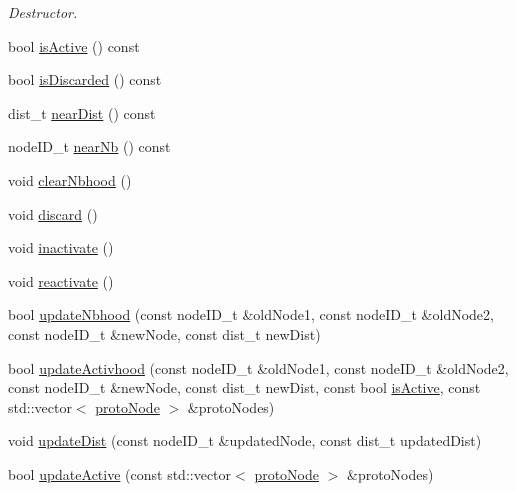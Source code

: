 \begin{DoxyCompactItemize}
\begin{DoxyCompactList}\small\item\em \-Destructor. \end{DoxyCompactList}\item 
bool \hyperlink{classprotoNode_aa1845f5c6b3dccbdbf34d5dc4a473908}{is\-Active} () const 
\item 
bool \hyperlink{classprotoNode_ab2d1c59170381bf98489530091fcaabe}{is\-Discarded} () const 
\item 
dist\-\_\-t \hyperlink{classprotoNode_affed3066e510c22006a56dde1821f255}{near\-Dist} () const 
\item 
node\-I\-D\-\_\-t \hyperlink{classprotoNode_a2520a90a64d192423f146e1499874f35}{near\-Nb} () const 
\item 
void \hyperlink{classprotoNode_ac5c5eaa32ec60fc7564c8c1955c50e1e}{clear\-Nbhood} ()
\item 
void \hyperlink{classprotoNode_a0d32591dc4d0bb2394debbeba755a307}{discard} ()
\item 
void \hyperlink{classprotoNode_a425759fb190957d0f40fd83c0a48bb51}{inactivate} ()
\item 
void \hyperlink{classprotoNode_a2eb4e11e5f22191a0f9624a9b72b42e6}{reactivate} ()
\item 
bool \hyperlink{classprotoNode_a888ebfa1e99e950ea4060378a13a5af0}{update\-Nbhood} (const node\-I\-D\-\_\-t \&old\-Node1, const node\-I\-D\-\_\-t \&old\-Node2, const node\-I\-D\-\_\-t \&new\-Node, const dist\-\_\-t new\-Dist)
\item 
bool \hyperlink{classprotoNode_aa639a669ad8f736ee88f8f9a89d98c75}{update\-Activhood} (const node\-I\-D\-\_\-t \&old\-Node1, const node\-I\-D\-\_\-t \&old\-Node2, const node\-I\-D\-\_\-t \&new\-Node, const dist\-\_\-t new\-Dist, const bool \hyperlink{classprotoNode_aa1845f5c6b3dccbdbf34d5dc4a473908}{is\-Active}, const std\-::vector$<$ \hyperlink{classprotoNode}{proto\-Node} $>$ \&proto\-Nodes)
\item 
void \hyperlink{classprotoNode_a890cde58417813b8fddd8d0aa56971a5}{update\-Dist} (const node\-I\-D\-\_\-t \&updated\-Node, const dist\-\_\-t updated\-Dist)
\item 
bool \hyperlink{classprotoNode_a59ee3e6b038b2c1d1ea51977dd42faca}{update\-Active} (const std\-::vector$<$ \hyperlink{classprotoNode}{proto\-Node} $>$ \&proto\-Nodes)
\end{DoxyCompactItemize}
